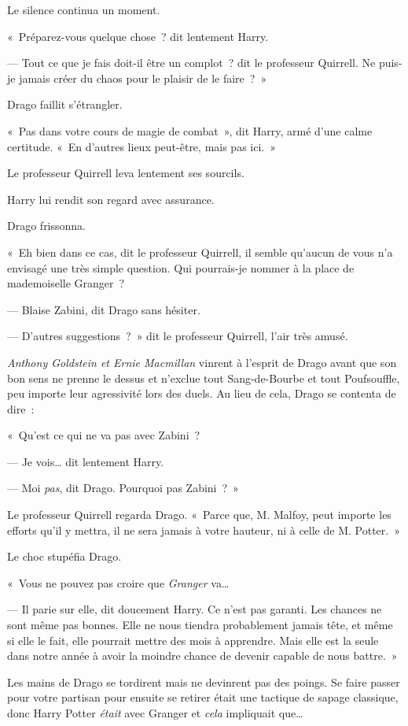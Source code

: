 Le silence continua un moment.

«~Préparez-vous quelque chose~? dit lentement Harry.

--- Tout ce que je fais doit-il être un complot~? dit le professeur Quirrell. Ne puis-je jamais créer du chaos pour le plaisir de le faire~?~»

Drago faillit s'étrangler.

«~Pas dans votre cours de magie de combat~», dit Harry, armé d'une calme certitude. «~En d'autres lieux peut-être, mais pas ici.~»

Le professeur Quirrell leva lentement ses sourcils.

Harry lui rendit son regard avec assurance.

Drago frissonna.

«~Eh bien dans ce cas, dit le professeur Quirrell, il semble qu'aucun de vous n'a envisagé une très simple question. Qui pourrais-je nommer à la place de mademoiselle Granger~?

--- Blaise Zabini, dit Drago sans hésiter.

--- D'autres suggestions~?~» dit le professeur Quirrell, l'air très amusé.

\emph{Anthony Goldstein et Ernie Macmillan} vinrent à l'esprit de Drago avant que son bon sens ne prenne le dessus et n'exclue tout Sang-de-Bourbe et tout Poufsouffle, peu importe leur agressivité lors des duels. Au lieu de cela, Drago se contenta de dire~:

«~Qu'est ce qui ne va pas avec Zabini~?

--- Je vois… dit lentement Harry.

--- Moi \emph{pas}, dit Drago. Pourquoi pas Zabini~?~»

Le professeur Quirrell regarda Drago. «~Parce que, M. Malfoy, peut importe les efforts qu'il y mettra, il ne sera jamais à votre hauteur, ni à celle de M. Potter.~»

Le choc stupéfia Drago.

«~Vous ne pouvez pas croire que \emph{Granger} va…

--- Il parie sur elle, dit doucement Harry. Ce n'est pas garanti. Les chances ne sont même pas bonnes. Elle ne nous tiendra probablement jamais tête, et même si elle le fait, elle pourrait mettre des mois à apprendre. Mais elle est la seule dans notre année à avoir la moindre chance de devenir capable de nous battre.~»

Les mains de Drago se tordirent mais ne devinrent pas des poings. Se faire passer pour votre partisan pour ensuite se retirer était une tactique de sapage classique, donc Harry Potter \emph{était} avec Granger et \emph{cela} impliquait que…

